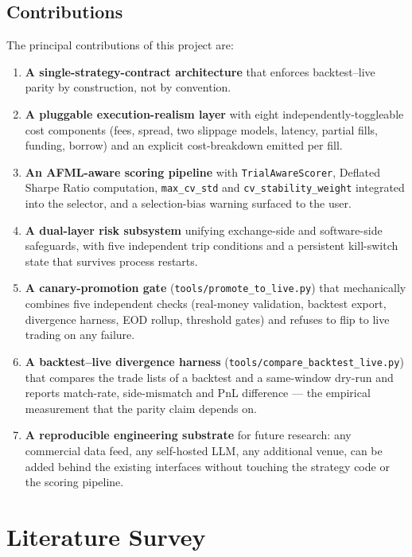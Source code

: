 \documentclass[a4paper, 12pt, titlepage]{article}
\begin{document}
\subsection{Contributions}

The principal contributions of this project are:

\begin{enumerate}[label=C\arabic*.,leftmargin=2em]
    \item \textbf{A single-strategy-contract architecture} that
    enforces backtest--live parity by construction, not by
    convention.
    \item \textbf{A pluggable execution-realism layer} with eight
    independently-toggleable cost components (fees, spread, two
    slippage models, latency, partial fills, funding, borrow) and an
    explicit cost-breakdown emitted per fill.
    \item \textbf{An AFML-aware scoring pipeline} with
    \texttt{TrialAwareScorer}, Deflated Sharpe Ratio computation,
    \texttt{max\_cv\_std} and \texttt{cv\_stability\_weight}
    integrated into the selector, and a selection-bias warning
    surfaced to the user.
    \item \textbf{A dual-layer risk subsystem} unifying
    exchange-side and software-side safeguards, with five
    independent trip conditions and a persistent kill-switch state
    that survives process restarts.
    \item \textbf{A canary-promotion gate} (\texttt{tools/promote\_to\_live.py})
    that mechanically combines five independent checks (real-money
    validation, backtest export, divergence harness, EOD rollup,
    threshold gates) and refuses to flip to live trading on any
    failure.
    \item \textbf{A backtest--live divergence harness}
    (\texttt{tools/compare\_backtest\_live.py}) that compares the
    trade lists of a backtest and a same-window dry-run and reports
    match-rate, side-mismatch and PnL difference --- the empirical
    measurement that the parity claim depends on.
    \item \textbf{A reproducible engineering substrate} for future
    research: any commercial data feed, any self-hosted LLM, any
    additional venue, can be added behind the existing interfaces
    without touching the strategy code or the scoring pipeline.
\end{enumerate}

\newpage
\section{Literature Survey}
\end{document}
